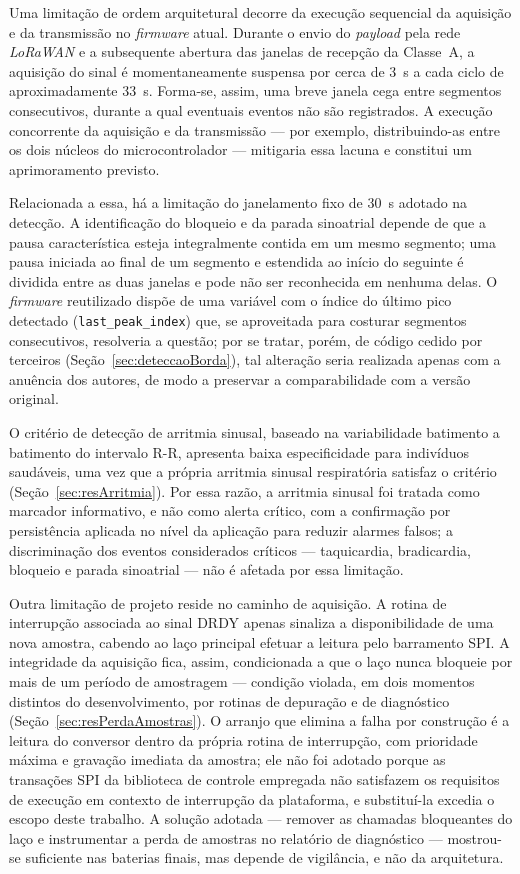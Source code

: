 Uma limitação de ordem arquitetural decorre da execução sequencial da aquisição e da transmissão no \textit{firmware} atual. Durante o envio do \textit{payload} pela rede \textit{LoRaWAN} e a subsequente abertura das janelas de recepção da Classe~A, a aquisição do sinal é momentaneamente suspensa por cerca de 3~s a cada ciclo de aproximadamente 33~s. Forma-se, assim, uma breve janela cega entre segmentos consecutivos, durante a qual eventuais eventos não são registrados. A execução concorrente da aquisição e da transmissão — por exemplo, distribuindo-as entre os dois núcleos do microcontrolador — mitigaria essa lacuna e constitui um aprimoramento previsto.

Relacionada a essa, há a limitação do janelamento fixo de 30~s adotado na detecção. A identificação do bloqueio e da parada sinoatrial depende de que a pausa característica esteja integralmente contida em um mesmo segmento; uma pausa iniciada ao final de um segmento e estendida ao início do seguinte é dividida entre as duas janelas e pode não ser reconhecida em nenhuma delas. O \textit{firmware} reutilizado dispõe de uma variável com o índice do último pico detectado (\texttt{last\_peak\_index}) que, se aproveitada para costurar segmentos consecutivos, resolveria a questão; por se tratar, porém, de código cedido por terceiros (Seção~\ref{sec:deteccaoBorda}), tal alteração seria realizada apenas com a anuência dos autores, de modo a preservar a comparabilidade com a versão original.

O critério de detecção de arritmia sinusal, baseado na variabilidade batimento a batimento do intervalo R-R, apresenta baixa especificidade para indivíduos saudáveis, uma vez que a própria arritmia sinusal respiratória satisfaz o critério (Seção~\ref{sec:resArritmia}). Por essa razão, a arritmia sinusal foi tratada como marcador informativo, e não como alerta crítico, com a confirmação por persistência aplicada no nível da aplicação para reduzir alarmes falsos; a discriminação dos eventos considerados críticos — taquicardia, bradicardia, bloqueio e parada sinoatrial — não é afetada por essa limitação.

Outra limitação de projeto reside no caminho de aquisição. A rotina de interrupção associada ao sinal \acs{DRDY} apenas sinaliza a disponibilidade de uma nova amostra, cabendo ao laço principal efetuar a leitura pelo barramento \acs{SPI}. A integridade da aquisição fica, assim, condicionada a que o laço nunca bloqueie por mais de um período de amostragem --- condição violada, em dois momentos distintos do desenvolvimento, por rotinas de depuração e de diagnóstico (Seção~\ref{sec:resPerdaAmostras}). O arranjo que elimina a falha por construção é a leitura do conversor dentro da própria rotina de interrupção, com prioridade máxima e gravação imediata da amostra; ele não foi adotado porque as transações \acs{SPI} da biblioteca de controle empregada não satisfazem os requisitos de execução em contexto de interrupção da plataforma, e substituí-la excedia o escopo deste trabalho. A solução adotada --- remover as chamadas bloqueantes do laço e instrumentar a perda de amostras no relatório de diagnóstico --- mostrou-se suficiente nas baterias finais, mas depende de vigilância, e não da arquitetura.

